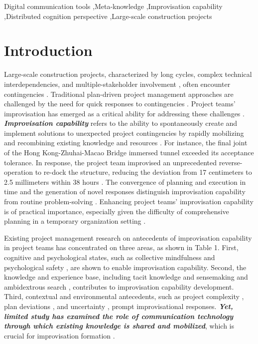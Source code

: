 \documentclass[authoryear,preprint,review,times,10pt]{elsarticle}
\begin{document}
\begin{frontmatter}
\begin{keyword}
Digital communication tools \sep Meta-knowledge \sep Improvisation capability \sep Distributed cognition perspective \sep Large-scale construction projects
\end{keyword}

\end{frontmatter}


\section{Introduction}
Large-scale construction projects, characterized by long cycles, complex technical interdependencies, and multiple-stakeholder involvement \citep{yang2025How}, often encounter contingencies \citep{shen2022Largescale}. Traditional plan-driven project management approaches are challenged by the need for quick responses to contingencies \citep{malucelli2021Facing,coulon2026Wing}. Project teams' improvisation has emerged as a critical ability for addressing these challenges \citep{sumbal2025Improvisation}. \textbf{\textit{Improvisation capability}} refers to the ability to spontaneously create and implement solutions to unexpected project contingencies by rapidly mobilizing and recombining existing knowledge and resources \citep{magni2009Role,veranghg2005Improvisation}. For instance, the final joint of the Hong Kong-Zhuhai-Macao Bridge immersed tunnel exceeded its acceptance tolerance. In response, the project team improvised an unprecedented reverse-operation to re-dock the structure, reducing the deviation from 17 centimeters to 2.5 millimeters within 38 hours \citep{21cbh2018Redocking}. The convergence of planning and execution in time and the generation of novel responses distinguish improvisation capability from routine problem-solving \citep{moorman1998Organizational, miner2001Organizational}. Enhancing project teams' improvisation capability is of practical importance, especially given the difficulty of comprehensive planning in a temporary organization setting \citep{wang2025Formalization}.

Existing project management research on antecedents of improvisation capability in project teams has concentrated on three areas, as shown in Table 1. First, cognitive and psychological states, such as collective mindfulness \citep{jiang2025Confronting} and psychological safety \citep{huang2026Thriving}, are shown to enable improvisation capability. Second, the knowledge and experience base, including tacit knowledge and sensemaking \citep{sumbal2025Improvisation} and ambidextrous search \citep{rui2022Contingent, klein2015Improvisation}, contributes to improvisation capability development. Third, contextual and environmental antecedents, such as project complexity \citep{mamedio2020Managing}, plan deviations \citep{vuorinen2019Lifecycle}, and uncertainty \citep{hacker2019Legitimizing}, prompt improvisational responses. \textbf{\textit{Yet, limited study has examined the role of communication technology through which existing knowledge is shared and mobilized}}, which is crucial for improvisation formation \citep{veranghg2005Improvisation}.
\end{document}
